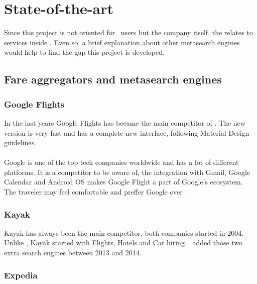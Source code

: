 
\chapter{State-of-the-art}

\label{chapter02}

Since this project is not oriented for \company\ users but the company itself, the \textit{} relates to services inside \company. Even so, a brief explanation about other metasearch engines would help to find the gap this project is developed.


\section{Fare aggregators and metasearch engines}

\subsection{Google Flights}

In the last years Google Flights\cite{google_flights} has became the main competitor of \company. The new version is very fast and has a complete new interface, following Material Design\cite{material_design} guidelines.
\\\\
Google is one of the top tech companies worldwide and has a lot of different platforms. It is a competitor to be aware of, the integration with Gmail, Google Calendar and Android OS makes Google Flight a part of Google's ecosystem. The traveler may feel comfortable and preffer Google over \company.

\subsection{Kayak}

Kayak\cite{kayak} has always been the main competitor, both companies started in 2004. Unlike \company, Kayak started with Flights, Hotels and Car hiring. \company\ added those two extra search engines between 2013 and 2014.

\subsection{Expedia}

